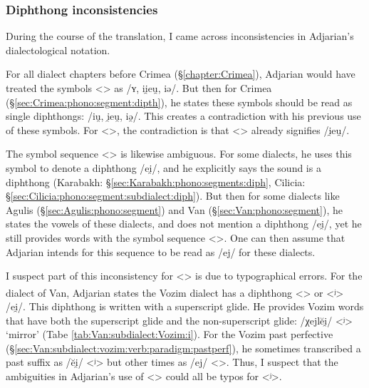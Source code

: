 \subsubsection{Diphthong inconsistencies}\label{sec:HossepIntro:phonotransc:adjerror}

During the course of the translation, I came across inconsistencies in Adjarian's dialectological notation. 

For all dialect chapters before Crimea (\S\ref{chapter:Crimea}), Adjarian would have treated the symbols <> as  /ʏ, ii̯eu̯, iə/. But then for Crimea (\S\ref{sec:Crimea:phono:segment:dipth}), he states these symbols should be read as single diphthongs: /iu̯, i̯eu̯,  iə̯/. This creates a contradiction with his previous use of these symbols. For <>, the contradiction is that <> already signifies /i̯eu̯/. 


The symbol sequence <> is likewise ambiguous. For some dialects, he uses this symbol to denote a diphthong /ei̯/, and he explicitly says the sound is a diphthong (Karabakh: \S\ref{sec:Karabakh:phono:segments:diph}, Cilicia: \S\ref{sec:Cilicia:phono:segment:subdialect:diph}). But then for some dialects like Agulis (\S\ref{sec:Agulis:phono:segment}) and Van (\S\ref{sec:Van:phono:segment}), he states the vowels of these dialects, and does not mention a diphthong /ei̯/, yet he still provides words with the symbol sequence <>. One can then assume that Adjarian intends for this sequence to be read as /ej/ for these dialects.  

I suspect part of this inconsistency for <> is due to typographical errors. For the dialect of Van, Adjarian states the Vozim dialect has a diphthong <\textsuperscript{}> or <ʲ> /ei̯/. This diphthong is written with a superscript glide. He provides Vozim words that have both the superscript glide and the non-superscript glide: /χejlĕi̯/ <ʲ> `mirror' (Tabe \ref{tab:Van:subdialect:Vozim:i}).   For the Vozim past perfective (\S\ref{sec:Van:subdialect:vozim:verb:paradigm:pastperf}), he sometimes transcribed a past suffix as /ĕi̯/ <ʲ> but other times as /ej/ <>. Thus, I suspect that the ambiguities in Adjarian's use of <> could all be typos for <ʲ>. 


 

